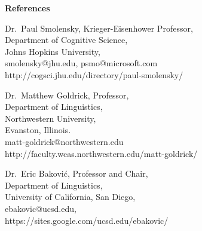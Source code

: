 \documentclass[11pt]{article}
\begin{document}
\noindent\textbf{References}

\medskip

\noindent Dr.\ Paul Smolensky, Krieger-Eisenhower Professor,\\
Department of Cognitive Science,\\
Johns Hopkins University,\\
smolensky@jhu.edu, psmo@microsoft.com\\
http://cogsci.jhu.edu/directory/paul-smolensky/


\bigskip

\noindent Dr.\  Matthew Goldrick, Professor,\\
Department of Linguistics,\\
Northwestern University, \\
Evanston, Illinois.\\
matt-goldrick@northwestern.edu\\
http://faculty.wcas.northwestern.edu/matt-goldrick/

\bigskip

\noindent Dr.\ Eric Bakovi\'c, Professor and Chair,\\
Department of Linguistics,\\
University of California, San Diego,\\
ebakovic@ucsd.edu,\\
https://sites.google.com/ucsd.edu/ebakovic/
\end{document}
